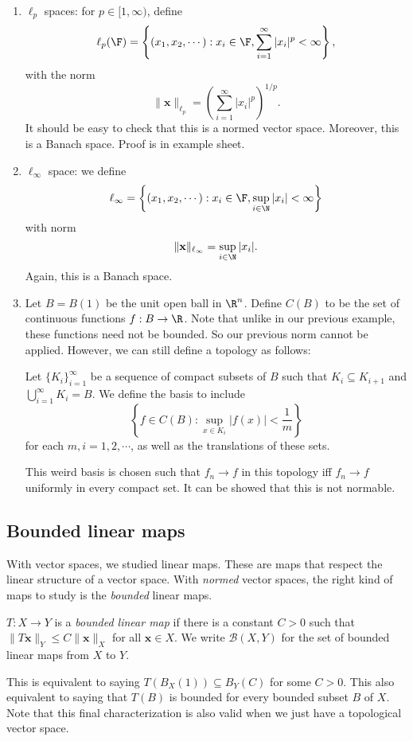 \documentclass[a4paper]{article}
\begin{document}
\begin{eg}
\begin{enumerate}
    \item $\ell_p$ spaces: for $p\in [1, \infty)$, define
        \[
          \ell_p (\F) = \left\{(x_1, x_2, \cdots): x_i \in \F, \sum_{i = 1}^\infty |x_i|^p < \infty\right\},
        \]
        with the norm
        \[
          \|\mathbf{x}\|_{\ell_p} = \left(\sum_{i = 1}^\infty |x_i|^p\right)^{1/p}.
        \]
        It should be easy to check that this is a normed vector space. Moreover, this is a Banach space. Proof is in example sheet.
      \item $\ell_\infty$ space: we define
        \[
          \ell_\infty = \left\{(x_1, x_2, \cdots): x_i\in \F, \sup_{i\in \N} |x_i| < \infty\right\}
        \]
        with norm
        \[
          \|\mathbf{x}\|_{\ell_\infty} = \sup_{i\in \N}|x_i|.
        \]
        Again, this is a Banach space.
      \item Let $B = B(1)$ be the unit open ball in $\R^n$. Define $C(B)$ to be the set of continuous functions $f: B\to \R$. Note that unlike in our previous example, these functions need not be bounded. So our previous norm cannot be applied. However, we can still define a topology as follows:

        Let $\{K_i\}_{i = 1}^\infty$ be a sequence of compact subsets of $B$ such that $K_i \subseteq K_{i + 1}$ and $\bigcup_{i = 1}^\infty K_i = B$. We define the basis to include
        \[
          \left\{f \in C(B): \sup_{x \in K_i} |f(x)| < \frac{1}{m}\right\}
        \]
        for each $m, i = 1, 2, \cdots$, as well as the translations of these sets.

        This weird basis is chosen such that $f_n \to f$ in this topology iff $f_n \to f$ uniformly in every compact set. It can be showed that this is not normable.
  \end{enumerate}
\end{eg}

\subsection{Bounded linear maps}
With vector spaces, we studied linear maps. These are maps that respect the linear structure of a vector space. With \emph{normed} vector spaces, the right kind of maps to study is the \emph{bounded} linear maps.

\begin{defi}
  $T: X\to Y$ is a \emph{bounded linear map} if there is a constant $C > 0$ such that $\|T\mathbf{x}\|_Y \leq C\|\mathbf{x}\|_X$ for all $\mathbf{x}\in X$. We write $\mathcal{B}(X, Y)$ for the set of bounded linear maps from $X$ to $Y$.
\end{defi}
This is equivalent to saying $T(B_X(1)) \subseteq B_Y(C)$ for some $C > 0$. This also equivalent to saying that $T(B)$ is bounded for every bounded subset $B$ of $X$. Note that this final characterization is also valid when we just have a topological vector space.
\end{document}
